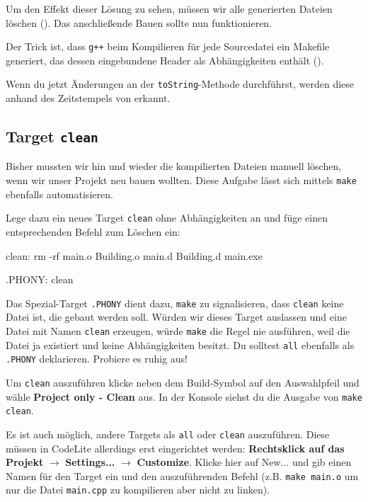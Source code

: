 Um den Effekt dieser Lösung zu sehen, müssen wir alle generierten Dateien löschen ().
Das anschließende Bauen sollte nun funktionieren.

Der Trick ist, dass \texttt{g++} beim Kompilieren für jede Sourcedatei ein Makefile generiert, das dessen eingebundene Header als Abhängigkeiten enthält ().

Wenn du jetzt Änderungen an der \lstinline{toString}-Methode durchführst, werden diese anhand des Zeitstempels von  erkannt.

\subsection{Target \lstinline{clean}}

Bisher mussten wir hin und wieder die kompilierten Dateien manuell löschen, wenn wir unser Projekt neu bauen wollten.
Diese Aufgabe lässt sich mittels \texttt{make} ebenfalls automatisieren.

Lege dazu ein neues Target \texttt{clean} ohne Abhängigkeiten an und füge einen entsprechenden Befehl zum Löschen ein:
\begin{lstmake}
clean:
    rm -rf main.o Building.o main.d Building.d main.exe

.PHONY: clean
\end{lstmake}
Das Spezial-Target \texttt{.PHONY} dient dazu, \texttt{make} zu signalisieren, dass \texttt{clean} keine Datei ist, die gebaut werden soll.
Würden wir dieses Target auslassen und eine Datei mit Namen \texttt{clean} erzeugen, würde \texttt{make} die Regel nie ausführen, weil die Datei ja existiert und keine Abhängigkeiten besitzt.
Du solltest \texttt{all} ebenfalls als \texttt{.PHONY} deklarieren.
Probiere es ruhig aus!

Um \texttt{clean} auszuführen klicke neben dem Build-Symbol auf den Auswahlpfeil und wähle \textbf{Project only - Clean} aus. In der Konsole siehst du die Ausgabe von \texttt{make clean}.

Es ist auch möglich, andere Targets als \texttt{all} oder \texttt{clean} auszuführen. Diese müssen in CodeLite allerdings erst eingerichtet werden: \textbf{Rechtsklick auf das Projekt} $\to$ \textbf{Settings...} $\to$ \textbf{Customize}. Klicke hier auf New... und gib einen Namen für den Target ein und den auszuführenden Befehl (z.B. \texttt{make main.o} um nur die Datei \texttt{main.cpp} zu kompilieren aber nicht zu linken).

